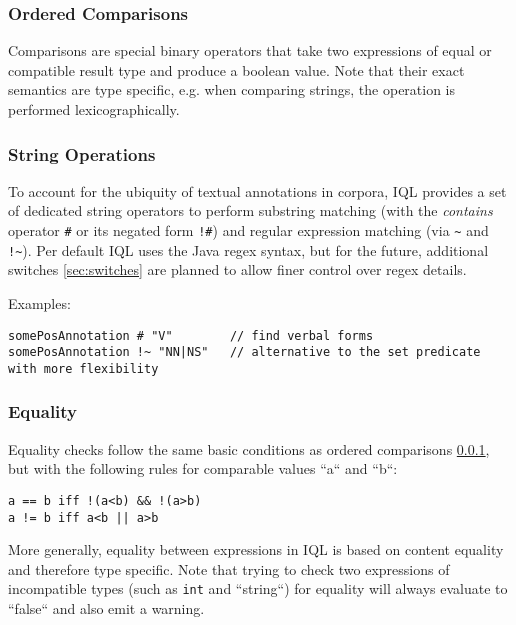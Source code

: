\documentclass[11pt]{article}
\begin{document}
\subsubsection{Ordered Comparisons}
\label{sec:ordered-comparisons}

Comparisons are special binary operators that take two expressions of equal or compatible result type and produce a boolean value. Note that their exact semantics are type specific, e.g. when comparing strings, the operation is performed lexicographically.

\subsubsection{String Operations}
\label{sec:string-operations}

To account for the ubiquity of textual annotations in corpora, IQL provides a set of dedicated string operators to perform substring matching (with the \textit{contains} operator \texttt{\#} or its negated form \texttt{!\#}) and regular expression matching (via \texttt{\textasciitilde} and \texttt{!\textasciitilde}). Per default IQL uses the Java regex syntax, but for the future, additional switches \cref{sec:switches} are planned to allow finer control over regex details.

Examples:

\begin{verbatim}
somePosAnnotation # "V"        // find verbal forms
somePosAnnotation !~ "NN|NS"   // alternative to the set predicate with more flexibility
\end{verbatim}

\subsubsection{Equality}
\label{sec:equality}

Equality checks follow the same basic conditions as ordered comparisons \cref{sec:ordered-comparisons}, but with the following rules for comparable values ``a`` and ``b``:

\begin{verbatim}
a == b iff !(a<b) && !(a>b)
a != b iff a<b || a>b
\end{verbatim}

More generally, equality between expressions in IQL is based on content equality and therefore type specific.
Note that trying to check two expressions of incompatible types (such as \texttt{int} and ``string``) for equality will always evaluate to ``false`` and also emit a warning. 
\end{document}
